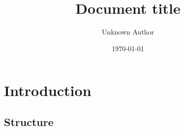\documentclass{article}
\begin{document}
\title{Document title}
\author{Unknown Author}
\date{\today}

\maketitle

\chapter{Introduction}
\section{Structure}
\end{document}
